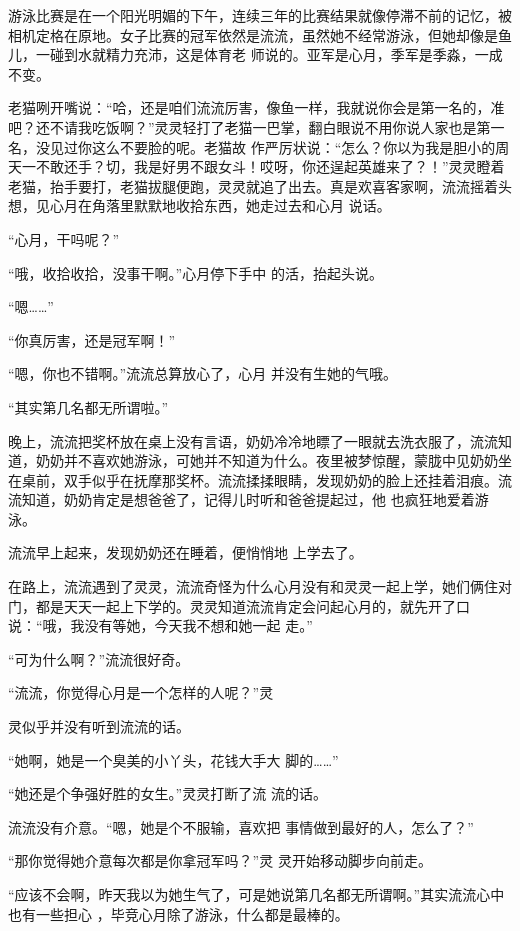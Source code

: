 \documentclass{article}
\begin{document}
游泳比赛是在一个阳光明媚的下午，连续三年的比赛结果就像停滞不前的记忆，被相机定格在原地。女子比赛的冠军依然是流流，虽然她不经常游泳，但她却像是鱼儿，一碰到水就精力充沛，这是体育老
师说的。亚军是心月，季军是季淼，一成不变。 

老猫咧开嘴说：“哈，还是咱们流流厉害，像鱼一样，我就说你会是第一名的，准吧？还不请我吃饭啊？”灵灵轻打了老猫一巴掌，翻白眼说不用你说人家也是第一名，没见过你这么不要脸的呢。老猫故
\newpage
作严厉状说：“怎么？你以为我是胆小的周天一不敢还手？切，我是好男不跟女斗！哎呀，你还逞起英雄来了？！”灵灵瞪着老猫，抬手要打，老猫拔腿便跑，灵灵就追了出去。真是欢喜客家啊，流流摇着头想，见心月在角落里默默地收拾东西，她走过去和心月
说话。 


“心月，干吗呢？” 

“哦，收拾收拾，没事干啊。”心月停下手中
的活，抬起头说。 


“嗯……” 


“你真厉害，还是冠军啊！” 

“嗯，你也不错啊。”流流总算放心了，心月
并没有生她的气哦。 


“其实第几名都无所谓啦。” 

\newpage

晚上，流流把奖杯放在桌上没有言语，奶奶冷冷地瞟了一眼就去洗衣服了，流流知道，奶奶并不喜欢她游泳，可她并不知道为什么。夜里被梦惊醒，蒙胧中见奶奶坐在桌前，双手似乎在抚摩那奖杯。流流揉揉眼睛，发现奶奶的脸上还挂着泪痕。流流知道，奶奶肯定是想爸爸了，记得儿时听和爸爸提起过，他
也疯狂地爱着游泳。 

流流早上起来，发现奶奶还在睡着，便悄悄地
上学去了。 

在路上，流流遇到了灵灵，流流奇怪为什么心月没有和灵灵一起上学，她们俩住对门，都是天天一起上下学的。灵灵知道流流肯定会问起心月的，就先开了口说：“哦，我没有等她，今天我不想和她一起
走。” 


“可为什么啊？”流流很好奇。 

“流流，你觉得心月是一个怎样的人呢？”灵

\newpage
灵似乎并没有听到流流的话。 

“她啊，她是一个臭美的小丫头，花钱大手大
脚的……” 

“她还是个争强好胜的女生。”灵灵打断了流
流的话。 

流流没有介意。“嗯，她是个不服输，喜欢把
事情做到最好的人，怎么了？” 

“那你觉得她介意每次都是你拿冠军吗？”灵
灵开始移动脚步向前走。 

“应该不会啊，昨天我以为她生气了，可是她说第几名都无所谓啊。”其实流流心中也有一些担心
，毕竞心月除了游泳，什么都是最棒的。 
\end{document}
